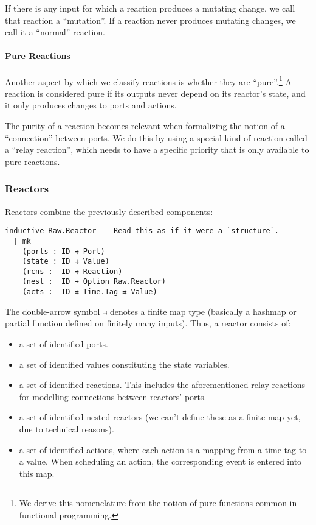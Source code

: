 If there is any input for which a reaction produces a mutating change, we call that reaction a ``mutation''.
If a reaction never produces mutating changes, we call it a ``normal'' reaction.

\paragraph{Pure Reactions}

Another aspect by which we classify reactions is whether they are ``pure''.\footnote{We derive this nomenclature from the notion of pure functions common in functional programming.}
A reaction is considered pure if its outputs never depend on its reactor's state, and it only produces changes to ports and actions.

The purity of a reaction becomes relevant when formalizing the notion of a ``connection'' between ports.
We do this by using a special kind of reaction called a ``relay reaction'', which needs to have a specific priority that is only available to pure reactions. 

\subsubsection{Reactors}

Reactors combine the previously described components:

\begin{lstlisting}
inductive Raw.Reactor -- Read this as if it were a `structure`.
  | mk 
    (ports : ID ⇉ Port)
    (state : ID ⇉ Value)
    (rcns :  ID ⇉ Reaction)
    (nest :  ID → Option Raw.Reactor)
    (acts :  ID ⇉ Time.Tag ⇉ Value)
\end{lstlisting}

The double-arrow symbol \lstinline{⇉} denotes a finite map type (basically a hashmap or partial function defined on finitely many inputs).
Thus, a reactor consists of:

\begin{itemize}
    \item a set of identified ports.
    \item a set of identified values constituting the state variables.
    \item a set of identified reactions. 
          This includes the aforementioned relay reactions for modelling connections between reactors' ports.
    \item a set of identified nested reactors (we can't define these as a finite map yet, due to technical reasons).
    \item a set of identified actions, where each action is a mapping from a time tag to a value. 
          When scheduling an action, the corresponding event is entered into this map.
\end{itemize}

